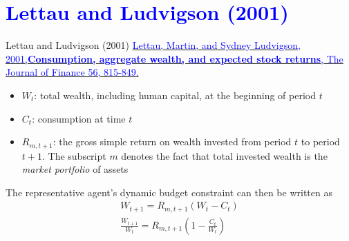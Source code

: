 \documentclass{beamer}
\begin{document}

\section{\textcolor{blue}{Lettau and Ludvigson (2001)}}

\begin{frame}{Lettau and Ludvigson (2001)}
	\href{https://doi.org/10.1111/0022-1082.00347}{\textcolor{blue}{Lettau, Martin, and Sydney Ludvigson, 2001,\textbf{Consumption, aggregate wealth, and expected stock returns}, The Journal of Finance 56, 815-849.}}
	\begin{itemize}
		\item $ W_t $: total wealth, including human capital, at the beginning of period $t$
		\item $ C_t $: consumption at time $t$
		\item $ R_{m,t+1} $: the gross simple return on wealth invested from period $ t $ to period $ t+1 $. The subscript $ m $ denotes the fact that total invested wealth is the \textit{market portfolio} of assets 
	\end{itemize}
	The representative agent's dynamic budget constraint can then be written as
	\begin{align}
		W_{t+1}=R_{m, t+1}\left(W_{t}-C_{t}\right)\\
		\frac{W_{t+1}}{W_{t}}=R_{m, t+1}\left(1-\frac{C_{t}}{W_{t}}\right)
	\end{align}
\end{frame}
\end{document}
